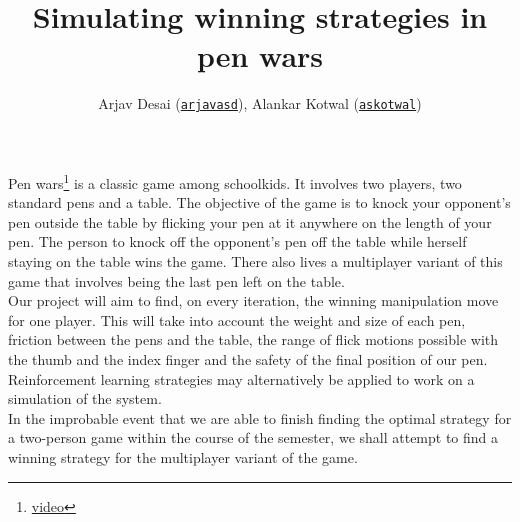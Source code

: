 \documentclass[12pt,letterpaper]{article}
\title{Simulating winning strategies in pen wars}
\author{Arjav Desai (\href{mailto:arjavasd@andrew.cmu.edu}{\texttt{arjavasd}}), Alankar Kotwal (\href{mailto:askotwal@andrew.cmu.edu}{\texttt{askotwal}})}
\begin{document}
\maketitle

\noindent Pen wars\footnote{\href{https://www.youtube.com/watch?v=hK0Xs3NbFNw}{video}} is a classic game among schoolkids. It involves two players, two standard pens and a table. The objective of the game is to knock your opponent's pen outside the table by flicking your pen at it anywhere on the length of your pen. The person to knock off the opponent's pen off the table while herself staying on the table wins the game. There also lives a multiplayer variant of this game that involves being the last pen left on the table. \\

\noindent Our project will aim to find, on every iteration, the winning manipulation move for one player. This will take into account the weight and size of each pen, friction between the pens and the table, the range of flick motions possible with the thumb and the index finger and the safety of the final position of our pen. Reinforcement learning strategies may alternatively be applied to work on a simulation of the system. \\

\noindent In the improbable event that we are able to finish finding the optimal strategy for a two-person game within the course of the semester, we shall attempt to find a winning strategy for the multiplayer variant of the game.
\end{document}
